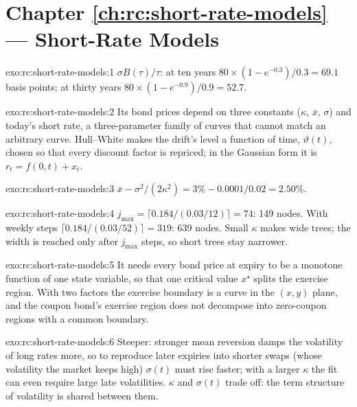 \section*{Chapter \ref{ch:rc:short-rate-models} --- Short-Rate Models}

\begin{solution}{exo:rc:short-rate-models:1}
$\sigma B(\tau)/\tau$: at ten years $80\times(1-e^{-0.3})/0.3 = 69.1$ basis points; at
thirty years $80\times(1-e^{-0.9})/0.9 = 52.7$.
\end{solution}

\begin{solution}{exo:rc:short-rate-models:2}
Its bond prices depend on three constants ($\kappa$, $\bar x$, $\sigma$) and today's short
rate, a three-parameter family of curves that cannot match an arbitrary curve.
Hull--White makes the drift's level a function of time, $\vartheta(t)$, chosen so
that every discount factor is repriced; in the Gaussian form it is $r_t =
f(0,t)+x_t$.
\end{solution}

\begin{solution}{exo:rc:short-rate-models:3}
$\bar x-\sigma^2/(2\kappa^2) = 3\%-0.0001/0.02 = 2.50\%$.
\end{solution}

\begin{solution}{exo:rc:short-rate-models:4}
$j_{\max} = \lceil0.184/(0.03/12)\rceil = 74$: 149 nodes. With weekly steps
$\lceil0.184/(0.03/52)\rceil = 319$: 639 nodes. Small $\kappa$ makes wide trees; the
width is reached only after $j_{\max}$ steps, so short trees stay narrower.
\end{solution}

\begin{solution}{exo:rc:short-rate-models:5}
It needs every bond price at expiry to be a monotone function of one state
variable, so that one critical value $x^\star$ splits the exercise region. With
two factors the exercise boundary is a curve in the $(x,y)$ plane, and the
coupon bond's exercise region does not decompose into zero-coupon regions with
a common boundary.
\end{solution}

\begin{solution}{exo:rc:short-rate-models:6}
Steeper: stronger mean reversion damps the volatility of long rates more, so
to reproduce later expiries into shorter swaps (whose volatility the market
keeps high) $\sigma(t)$ must rise faster; with a larger $\kappa$ the fit can even require
large late volatilities. $\kappa$ and $\sigma(t)$ trade off: the term structure of
volatility is shared between them.
\end{solution}

